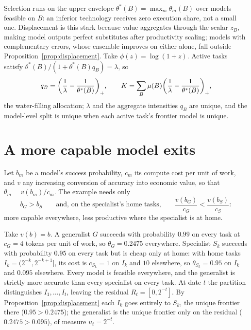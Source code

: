 \documentclass[preprint,11pt,authoryear]{elsarticle}
\DeclarePairedDelimiter{\pos}{(}{)_{+}}
\begin{document}
Selection runs on the upper envelope $\theta^*(B) = \max_m \theta_m(B)$ over models feasible on $B$: an inferior technology receives zero execution share, not a small one. Displacement is this stark because value aggregates through the scalar $z_B$, making model outputs perfect substitutes after productivity scaling; models with complementary errors, whose ensemble improves on either alone, fall outside Proposition~\ref{prop:displacement}. Take $\phi(z) = \log(1+z)$. Active tasks satisfy $\theta^*(B) / (1 + \theta^*(B) q_B) = \lambda$, so
\begin{equation}
\label{eq:waterfill}
q_B = \pos*{\frac{1}{\lambda} - \frac{1}{\theta^*(B)}},
\qquad
K = \sum_B \mu(B) \pos*{\frac{1}{\lambda} - \frac{1}{\theta^*(B)}},
\end{equation}
the water-filling allocation; $\lambda$ and the aggregate intensities $q_B$ are unique, and the model-level split is unique when each active task's frontier model is unique.

\section{A more capable model exits}
\label{sec:exit}

Let $b_m$ be a model's success probability, $c_m$ its compute cost per unit of work, and $v$ any increasing conversion of accuracy into economic value, so that $\theta_m = v(b_m)/c_m$. The example needs only
\begin{equation}
b_G > b_S
\qquad\text{and, on the specialist's home tasks,}\qquad
\frac{v(b_G)}{c_G} < \frac{v(b_S)}{c_S}:
\end{equation}
more capable everywhere, less productive where the specialist is at home.

Take $v(b) = b$. A generalist $G$ succeeds with probability $0.99$ on every task at $c_G = 4$ tokens per unit of work, so $\theta_G = 0.2475$ everywhere. Specialist $S_k$ succeeds with probability $0.95$ on every task but is cheap only at home: with home tasks $I_k = (2^{-k}, 2^{-k+1}]$, its cost is $c_{S_k} = 1$ on $I_k$ and $10$ elsewhere, so $\theta_{S_k} = 0.95$ on $I_k$ and $0.095$ elsewhere. Every model is feasible everywhere, and the generalist is strictly more accurate than every specialist on every task. At date $t$ the partition distinguishes $I_1, \ldots, I_t$, leaving the residual $R_t = [0, 2^{-t}]$. By Proposition~\ref{prop:displacement} each $I_k$ goes entirely to $S_k$, the unique frontier there ($0.95 > 0.2475$); the generalist is the unique frontier only on the residual ($0.2475 > 0.095$), of measure $u_t = 2^{-t}$.
\end{document}
